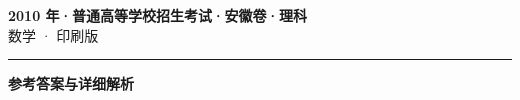 \documentclass[zihao=5, a4paper]{ctexart}
\begin{document}
\begin{center}
  {\Large\bfseries 2010 年·普通高等学校招生考试·安徽卷·理科}\\[4pt]
  {\large 数学 · 印刷版}
\end{center}
\medskip
{}

\par\bigskip\hrule\bigskip
{}
\begin{center}{\large\bfseries 参考答案与详细解析}\end{center}
\smallskip

\end{document}
